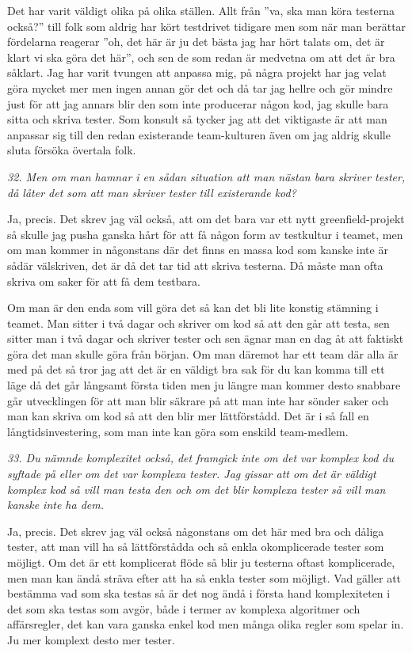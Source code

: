\documentclass[11pt]{article}
\begin{document}
Det har varit väldigt olika på olika ställen. Allt från ”va, ska man köra testerna också?” till folk som aldrig har kört testdrivet tidigare men som när man berättar fördelarna reagerar ”oh, det här är ju det bästa jag har hört talats om, det är klart vi ska göra det här”, och sen de som redan är medvetna om att det är bra såklart. Jag har varit tvungen att anpassa mig, på några projekt har jag velat göra mycket mer men ingen annan gör det och då tar jag hellre och gör mindre just för att jag annars blir den som inte producerar någon kod, jag skulle bara sitta och skriva tester. Som konsult så tycker jag att det viktigaste är att man anpassar sig till den redan existerande team-kulturen även om jag aldrig skulle sluta försöka övertala folk.

\emph{32. Men om man hamnar i en sådan situation att man nästan bara skriver tester, då låter det som att man skriver tester till existerande kod?}

Ja, precis. Det skrev jag väl också, att om det bara var ett nytt greenfield-projekt så skulle jag pusha ganska hårt för att få någon form av testkultur i teamet, men om man kommer in någonstans där det finns en massa kod som kanske inte är sådär välskriven, det är då det tar tid att skriva testerna. Då måste man ofta skriva om saker för att få dem testbara.

Om man är den enda som vill göra det så kan det bli lite konstig stämning i teamet. Man sitter i två dagar och skriver om kod så att den går att testa, sen sitter man i två dagar och skriver tester och sen ägnar man en dag åt att faktiskt göra det man skulle göra från början. Om man däremot har ett team där alla är med på det så tror jag att det är en väldigt bra sak för du kan komma till ett läge då det går långsamt första tiden men ju längre man kommer desto snabbare går utvecklingen för att man blir säkrare på att man inte har sönder saker och man kan skriva om kod så att den blir mer lättförstådd. Det är i så fall en långtidsinvestering, som man inte kan göra som enskild team-medlem.

\emph{33. Du nämnde komplexitet också, det framgick inte om det var komplex kod du syftade på eller om det var komplexa tester. Jag gissar att om det är väldigt komplex kod så vill man testa den och om det blir komplexa tester så vill man kanske inte ha dem.}

Ja, precis. Det skrev jag väl också någonstans om det här med bra och dåliga tester, att man vill ha så lättförstådda och så enkla okomplicerade tester som möjligt. Om det är ett komplicerat flöde så blir ju testerna oftast komplicerade, men man kan ändå sträva efter att ha så enkla tester som möjligt. Vad gäller att bestämma vad som ska testas så är det nog ändå i första hand komplexiteten i det som ska testas som avgör, både i termer av komplexa algoritmer och affärsregler, det kan vara ganska enkel kod men många olika regler som spelar in. Ju mer komplext desto mer tester.
\end{document}
